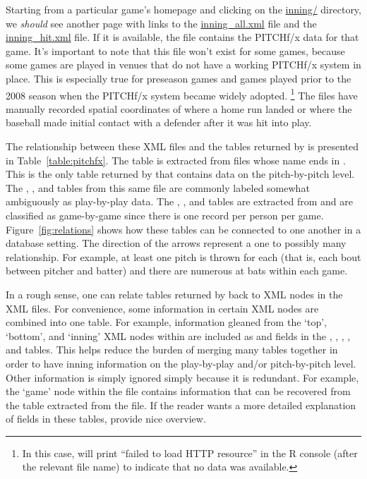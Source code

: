 \documentclass[a4paper]{report}\usepackage[]{graphicx}\usepackage[]{color}
\begin{document}
\begin{article}
Starting from a particular game's homepage and clicking on the \href{http://gd2.mlb.com/components/game/mlb/year_2011/month_02/day_26/gid_2011_02_26_phimlb_nyamlb_1/inning/}{inning/}
directory, we \emph{should} see another page with links to the \href{http://gd2.mlb.com/components/game/mlb/year_2011/month_02/day_26/gid_2011_02_26_phimlb_nyamlb_1/inning/inning_all.xml}{inning\_all.xml}
file and the \href{http://gd2.mlb.com/components/game/mlb/year_2011/month_02/day_26/gid_2011_02_26_phimlb_nyamlb_1/inning/inning_hit.xml}{inning\_hit.xml}
file. If it is available, the  file contains
the PITCHf/x data for that game. It's important to note that this
file won't exist for some games, because some games are played in
venues that do not have a working PITCHf/x system in place. This is
especially true for preseason games and games played prior to the
2008 season when the PITCHf/x system became widely adopted.%
\footnote{In this case,  will print ``failed to load HTTP resource''
in the R console (after the relevant file name) to indicate that no
data was available.%
} The  files have manually recorded spatial
coordinates of where a home run landed or where the baseball made
initial contact with a defender after it was hit into play.

The relationship between these XML files and the tables returned by
 is presented in Table~\ref{table:pitchfx}. The 
table is extracted from files whose name ends in .
This is the only table returned by  that contains data
on the pitch-by-pitch level. The , , 
and  tables from this same file are commonly labeled somewhat
ambiguously as play-by-play data. The , ,
and  tables are extracted from  and
are classified as game-by-game since there is one record per person
per game. Figure~\ref{fig:relations} shows how these tables can
be connected to one another in a database setting. The direction of
the arrows represent a one to possibly many relationship. For example,
at least one pitch is thrown for each  (that is, each
bout between pitcher and batter) and there are numerous at bats within
each game. 

In a rough sense, one can relate tables returned by 
back to XML nodes in the XML files. For convenience, some information
in certain XML nodes are combined into one table. For example, information
gleaned from the `top', `bottom', and `inning' XML nodes within 
are included as  and  fields in
the , , , , and
 tables. This helps reduce the burden of merging many
tables together in order to have inning information on the play-by-play
and/or pitch-by-pitch level. Other information is simply ignored simply
because it is redundant. For example, the `game' node within the 
file contains information that can be recovered from the 
table extracted from the  file. If the reader
wants a more detailed explanation of fields in these tables, \citet{baseball}
provide nice overview. 


\end{article}
\end{document}
